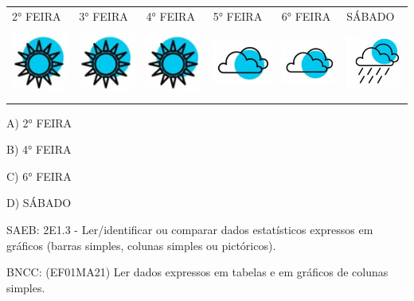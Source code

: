 \begin{longtable}[]{@{}llllll@{}}
\toprule
2° FEIRA & 3° FEIRA & 4° FEIRA & 5° FEIRA & 6° FEIRA &
SÁBADO\tabularnewline
\includegraphics[width=0.85429in,height=0.89596in]{media/image136.png} &
\includegraphics[width=0.85429in,height=0.89596in]{media/image136.png} &
\includegraphics[width=0.85429in,height=0.89596in]{media/image136.png} &
\includegraphics[width=0.88247in,height=0.64865in]{media/image137.png} &
\includegraphics[width=0.81068in,height=0.59588in]{media/image137.png} &
\includegraphics[width=0.77289in,height=0.73191in]{media/image138.png}\tabularnewline
\bottomrule
\end{longtable}

A) 2° FEIRA

B) 4° FEIRA

C) 6° FEIRA

D) SÁBADO

SAEB: 2E1.3 - Ler/identificar ou comparar dados estatísticos expressos
em gráficos (barras simples, colunas simples ou pictóricos).

BNCC: (EF01MA21) Ler dados expressos em tabelas e em gráficos de colunas
simples.


